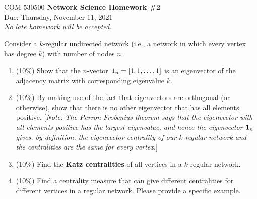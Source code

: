 \documentclass[12pt]{article}
\begin{document}
\thispagestyle{empty}
\begin{center}
{\Large \noindent COM 530500 {\bf Network Science Homework \#2} \\
\large {{\sc Due:} Thursday, November 11, 2021}  \\
}
\emph{No late homework will be accepted}.
\end{center}





\bigskip


 Consider a $k$-regular undirected network (i.e., a network in which every vertex has degree $k$) with number of nodes $n$.
\begin{enumerate}[label=(\alph*)]
	\item (10\%) Show that the $n$-vector ${\bf 1}_n = [1,1,\ldots,1]$ is an eigenvector of the adjacency matrix with corresponding eigenvalue $k$. 
	\item (10\%) By making use of the fact that eigenvectors are orthogonal (or otherwise), show that there is no other eigenvector that has all elements positive. [{\it Note: The Perron-Frobenius theorem says that the eigenvector with all elements positive has the largest eigenvalue, and hence the eigenvector ${\bf 1}_n$ gives, by definition, the eigenvector centrality of our $k$-regular network and the centralities are the same for every vertex.}]
	\item (10\%) Find the {\bf Katz centralities} of all vertices in a $k$-regular network.
	\item (10\%) Find a centrality measure that can give different centralities for different vertices in a regular network. Please provide a specific example.
\end{enumerate}
\end{document}
